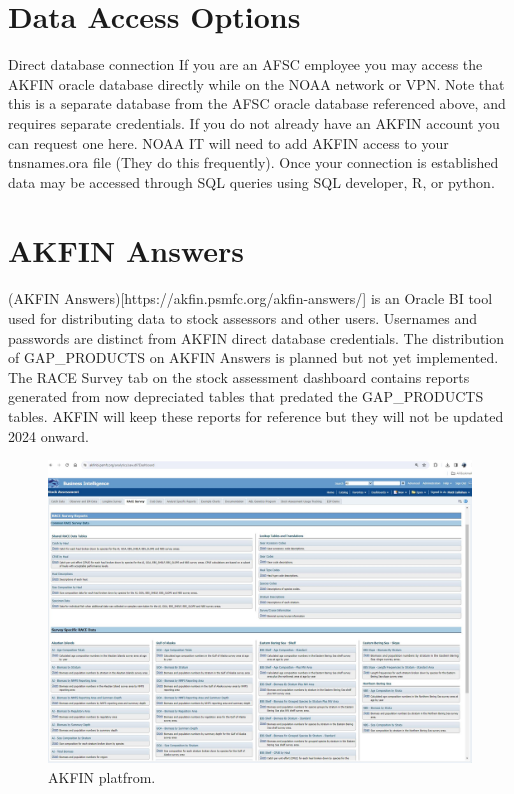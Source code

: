 \documentclass[
  letterpaper,
  oneside,
  open=any]{scrbook}
\begin{document}
\section*{Data Access Options}\label{data-access-options}


Direct database connection If you are an AFSC employee you may access
the AKFIN oracle database directly while on the NOAA network or VPN.
Note that this is a separate database from the AFSC oracle database
referenced above, and requires separate credentials. If you do not
already have an AKFIN account you can request one here. NOAA IT will
need to add AKFIN access to your tnsnames.ora file (They do this
frequently). Once your connection is established data may be accessed
through SQL queries using SQL developer, R, or python.

\section*{AKFIN Answers}\label{akfin-answers}


(AKFIN Answers){[}https://akfin.psmfc.org/akfin-answers/{]} is an Oracle
BI tool used for distributing data to stock assessors and other users.
Usernames and passwords are distinct from AKFIN direct database
credentials. The distribution of GAP\_PRODUCTS on AKFIN Answers is
planned but not yet implemented. The RACE Survey tab on the stock
assessment dashboard contains reports generated from now depreciated
tables that predated the GAP\_PRODUCTS tables. AKFIN will keep these
reports for reference but they will not be updated 2024 onward.

\begin{figure}[H]

{\centering \includegraphics[width=6.22in,height=\textheight]{content/../img/akfin.jpg}

}

\caption{AKFIN platfrom.}

\end{figure}%
\end{document}
